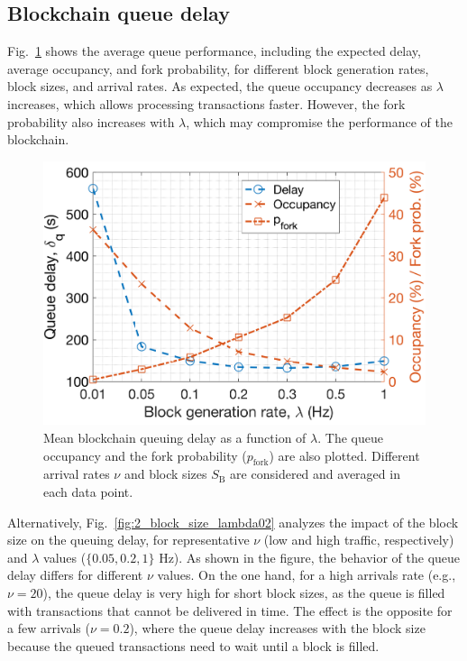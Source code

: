 \documentclass[lettersize,journal]{IEEEtran}
\begin{document}
\subsection{Blockchain queue delay}

Fig.~\ref{fig:bc_delay_mu} shows the average queue performance, including the expected delay, average occupancy, and fork probability, for different block generation rates, block sizes, and arrival rates. As expected, the queue occupancy decreases as $\lambda$ increases, which allows processing transactions faster. However, the fork probability also increases with $\lambda$, which may compromise the performance of the blockchain.

\begin{figure}[ht!]
	\centering
	\includegraphics[width=.65\linewidth]{img/1_mean_occupancy_delay_2.png}
	\caption{Mean blockchain queuing delay as a function of $\lambda$. The queue occupancy and the fork probability ($p_\text{fork}$) are also plotted. Different arrival rates $\nu$ and block sizes $S_\text{B}$ are considered and averaged in each data point.}
	\label{fig:bc_delay_mu}
\end{figure}

Alternatively, Fig.~\ref{fig:2_block_size_lambda02} analyzes the impact of the block size on the queuing delay, for representative $\nu$ (low and high traffic, respectively) and $\lambda$ values ($\{0.05, 0.2, 1\}$ Hz). As shown in the figure, the behavior of the queue delay differs for different $\nu$ values. On the one hand, for a high arrivals rate (e.g., $\nu = 20$), the queue delay is very high for short block sizes, as the queue is filled with transactions that cannot be delivered in time. The effect is the opposite for a few arrivals ($\nu = 0.2$), where the queue delay increases with the block size because the queued transactions need to wait until a block is filled.
\end{document}
